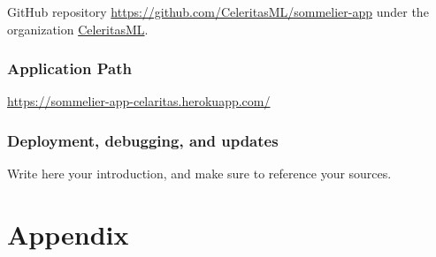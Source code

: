 \documentclass[
]{kaohandt}
\begin{document}
GitHub repository \href{https://github.com/CeleritasML/sommelier-app}{https://github.com/CeleritasML/sommelier-app} under the organization \href{https://github.com/CeleritasML}{CeleritasML}.

\subsubsection*{Application Path}

\href{https://sommelier-app-celaritas.herokuapp.com/}{https://sommelier-app-celaritas.herokuapp.com/}

\subsubsection*{Deployment, debugging, and updates}

Write here your introduction, and make sure to
reference your sources.

\blindtext\sidenote[][*-8]{\blindtext}

\appendix %

\section{Appendix}

\blindtext



\end{document}
